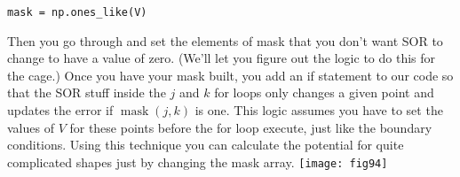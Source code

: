 \begin{problem}
\begin{enumerate}[label=(\alph*)]
\begin{lstlisting}
mask = np.ones_like(V)
\end{lstlisting}
Then you go through and set the elements of mask that you don't want SOR to change to have a value of zero. (We'll let you figure out the logic to do this for the cage.) Once you have your mask built, you add an if statement to our code so that the SOR stuff inside the $j$ and $k$ for loops only changes a given point and updates the error if $\operatorname{mask}(j, k)$ is one. This logic assumes you have to set the values of $V$ for these points before the for loop execute, just like the boundary conditions. Using this technique you can calculate the potential for quite complicated shapes just by changing the mask array.
\texttt{[image: fig94]}
\end{enumerate}
\end{problem}
